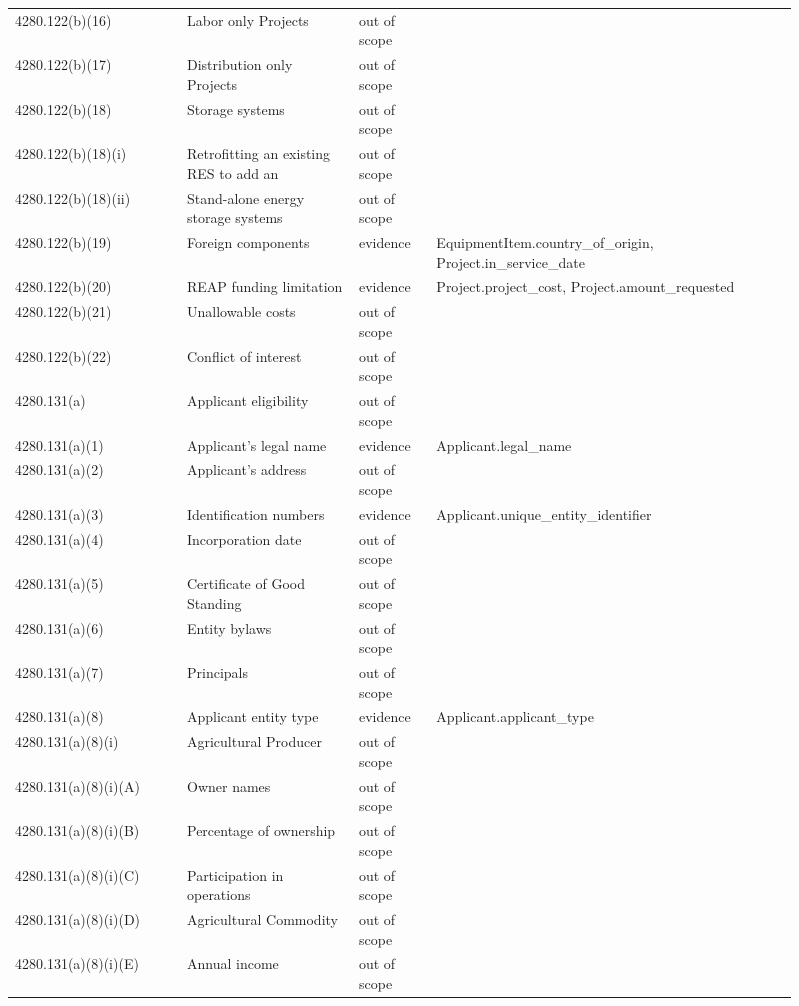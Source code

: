 \begin{longtable}{p{0.2\linewidth}p{0.2\linewidth}p{0.09\linewidth}p{0.42\linewidth}}
4280.122(b)(16) & Labor only Projects & out of scope &  \\
4280.122(b)(17) & Distribution only Projects & out of scope &  \\
4280.122(b)(18) & Storage systems & out of scope &  \\
4280.122(b)(18)(i) & Retrofitting an existing RES to add an & out of scope &  \\
4280.122(b)(18)(ii) & Stand-alone energy storage systems & out of scope &  \\
4280.122(b)(19) & Foreign components & evidence & EquipmentItem.country\_of\_origin, Project.in\_service\_date \\
4280.122(b)(20) & REAP funding limitation & evidence & Project.project\_cost, Project.amount\_requested \\
4280.122(b)(21) & Unallowable costs & out of scope &  \\
4280.122(b)(22) & Conflict of interest & out of scope &  \\
4280.131(a) & Applicant eligibility & out of scope &  \\
4280.131(a)(1) & Applicant's legal name & evidence & Applicant.legal\_name \\
4280.131(a)(2) & Applicant's address & out of scope &  \\
4280.131(a)(3) & Identification numbers & evidence & Applicant.unique\_entity\_identifier \\
4280.131(a)(4) & Incorporation date & out of scope &  \\
4280.131(a)(5) & Certificate of Good Standing & out of scope &  \\
4280.131(a)(6) & Entity bylaws & out of scope &  \\
4280.131(a)(7) & Principals & out of scope &  \\
4280.131(a)(8) & Applicant entity type & evidence & Applicant.applicant\_type \\
4280.131(a)(8)(i) & Agricultural Producer & out of scope &  \\
4280.131(a)(8)(i)(A) & Owner names & out of scope &  \\
4280.131(a)(8)(i)(B) & Percentage of ownership & out of scope &  \\
4280.131(a)(8)(i)(C) & Participation in operations & out of scope &  \\
4280.131(a)(8)(i)(D) & Agricultural Commodity & out of scope &  \\
4280.131(a)(8)(i)(E) & Annual income & out of scope &  \\

\end{longtable}
